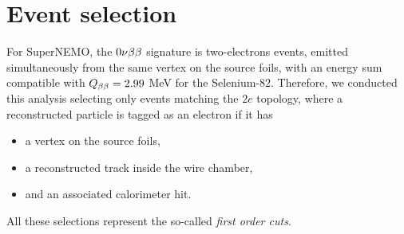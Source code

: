 \section{Event selection}
\label{sec:sensitivity_ev_selection}

For SuperNEMO, the $0\nu\beta\beta$ signature is two-electrons events, emitted simultaneously from the same vertex on the source foils, with an energy sum compatible with $Q_{\beta\beta} = 2.99$ MeV for the Selenium-$82$.
Therefore, we conducted this analysis selecting only events matching the $2e$ topology, where a reconstructed particle is tagged as an electron if it has
\begin{itemize}
\item a vertex on the source foils,
\item a reconstructed track inside the wire chamber,
  \item and an associated calorimeter hit.
\end{itemize}
All these selections represent the so-called \emph{first order cuts}.


